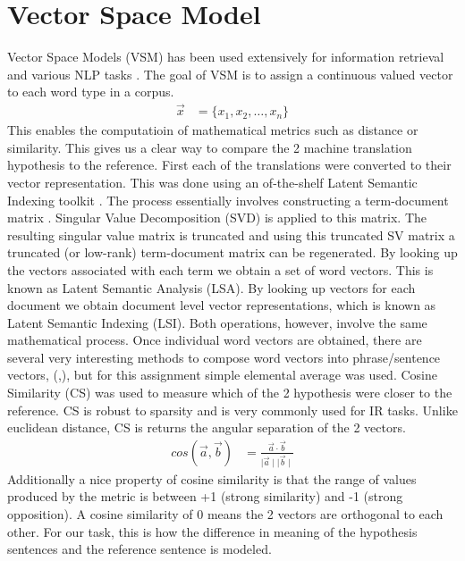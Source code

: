 \documentclass[11pt]{article}
\begin{document}
\section{Vector Space Model}
Vector Space Models (VSM) has been used extensively for information retrieval
and various NLP tasks \cite{Manning:2008:IIR:1394399}. The goal of VSM is to
assign a continuous valued vector to each word type in a corpus.\\
\begin{align*}                                                                                                                                                                   
\vec{x} &= \{ x_1, x_2, \ldots, x_n\}
\end{align*}
 This enables the computatioin of mathematical metrics such as distance or
 similarity. This gives us a clear way to compare the 2 machine translation
 hypothesis to the reference. First each of the translations were converted to
 their vector representation. This was done using an of-the-shelf Latent
 Semantic Indexing toolkit \cite{rehurek_lrec}. The process essentially
 involves constructing a term-document matrix \cite{turney2010frequency}.
 Singular Value Decomposition (SVD) is applied to this matrix. The resulting singular value matrix is
 truncated and using this truncated SV matrix a truncated (or low-rank)
 term-document matrix can be regenerated. By looking up the vectors associated
 with each term we obtain a set of word vectors. This is known as Latent
 Semantic Analysis (LSA). By looking up vectors for each document we obtain
 document level vector representations, which is known as Latent Semantic
 Indexing (LSI). Both operations, however, involve the same mathematical
 process. Once individual word vectors are obtained, there are several very
 interesting methods to compose word vectors into phrase/sentence vectors,
 (\cite{hermann2013role},\cite{socher2012semantic}), but for this assignment
 simple elemental average was used. Cosine Similarity (CS) was used to measure which of the 2 hypothesis were closer to the reference. CS is robust to sparsity and is very commonly used for IR tasks. Unlike euclidean distance, CS is returns the angular separation of the 2 vectors.
 \begin{align*}
 cos(\vec{a},\vec{b}) &= \frac{\vec{a}\cdot \vec{b}}{\mid\vec{a}\mid
 \mid\vec{b}\mid}
 \end{align*}
 Additionally a nice property of cosine similarity is that the range of values
 produced by the metric is between +1 (strong similarity) and -1 (strong
 opposition). A cosine similarity of 0 means the 2 vectors are orthogonal to
 each other. For our task, this is how the difference in meaning of the
 hypothesis sentences and the reference sentence is modeled.
\end{document}
